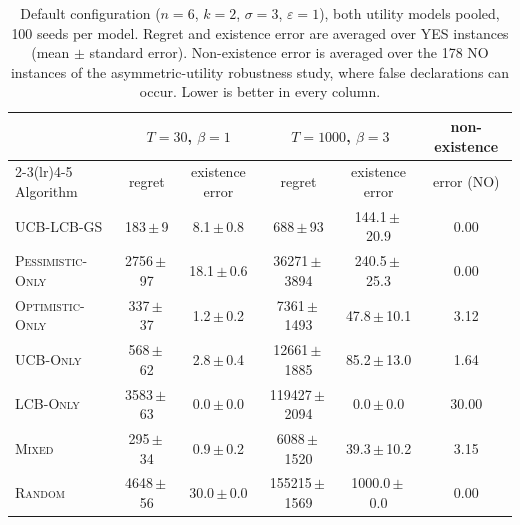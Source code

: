 \begin{table}[t]
\centering
\caption{Default configuration ($n=6$, $k=2$, $\sigma=3$, $\varepsilon=1$), both utility models pooled, 100 seeds per model. Regret and existence error are averaged over YES instances (mean $\pm$ standard error). Non-existence error is averaged over the 178 NO instances of the asymmetric-utility robustness study, where false declarations can occur. Lower is better in every column.}
\label{tab:main}
\small
\setlength{\tabcolsep}{4pt}
\begin{tabular}{lccccc}
\toprule
& \multicolumn{2}{c}{$T=30$, $\beta=1$} & \multicolumn{2}{c}{$T=1000$, $\beta=3$} & non-existence \\
\cmidrule(lr){2-3}\cmidrule(lr){4-5}
Algorithm & regret & existence error & regret & existence error & error (NO) \\
\midrule
\textsc{UCB-LCB-GS} & 183\,$\pm$\,9 & 8.1\,$\pm$\,0.8 & 688\,$\pm$\,93 & 144.1\,$\pm$\,20.9 & 0.00 \\
\textsc{Pessimistic-Only} & 2756\,$\pm$\,97 & 18.1\,$\pm$\,0.6 & 36271\,$\pm$\,3894 & 240.5\,$\pm$\,25.3 & 0.00 \\
\textsc{Optimistic-Only} & 337\,$\pm$\,37 & 1.2\,$\pm$\,0.2 & 7361\,$\pm$\,1493 & 47.8\,$\pm$\,10.1 & 3.12 \\
\textsc{UCB-Only} & 568\,$\pm$\,62 & 2.8\,$\pm$\,0.4 & 12661\,$\pm$\,1885 & 85.2\,$\pm$\,13.0 & 1.64 \\
\textsc{LCB-Only} & 3583\,$\pm$\,63 & 0.0\,$\pm$\,0.0 & 119427\,$\pm$\,2094 & 0.0\,$\pm$\,0.0 & 30.00 \\
\textsc{Mixed} & 295\,$\pm$\,34 & 0.9\,$\pm$\,0.2 & 6088\,$\pm$\,1520 & 39.3\,$\pm$\,10.2 & 3.15 \\
\textsc{Random} & 4648\,$\pm$\,56 & 30.0\,$\pm$\,0.0 & 155215\,$\pm$\,1569 & 1000.0\,$\pm$\,0.0 & 0.00 \\
\bottomrule
\end{tabular}
\end{table}
